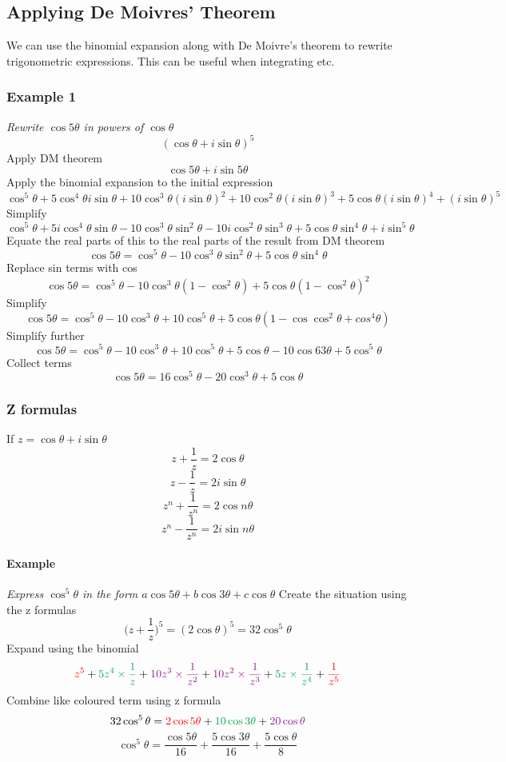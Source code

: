 \documentclass{article}[18pt]
\begin{document}
\subsection{Applying De Moivres' Theorem}
We can use the binomial expansion along with De Moivre's theorem to rewrite trigonometric expressions. This can be useful when integrating etc.
\subsubsection{Example 1}
\textit{Rewrite $\cos5\theta$ in powers of $\cos\theta$}
$$(\cos\theta+i\sin\theta)^5$$
Apply DM theorem
$$\cos5\theta+i\sin5\theta$$
Apply the binomial expansion to the initial expression
$$\cos^5\theta+5\cos^4\theta i\sin\theta+10\cos^3\theta(i\sin\theta)^2+10\cos^2\theta(i\sin\theta)^3+5\cos\theta(i\sin\theta)^4+(i\sin\theta)^5$$
Simplify
$$\cos^5\theta+5i\cos^4\theta\sin\theta-10\cos^3\theta\sin^2\theta-10i\cos^2\theta\sin^3\theta+5\cos\theta\sin^4\theta+i\sin^5\theta$$
Equate the real parts of this to the real parts of the result from DM theorem
$$\cos5\theta=\cos^5\theta-10\cos^3\theta\sin^2\theta+5\cos\theta\sin^4\theta$$
Replace sin terms with cos
$$\cos5\theta=\cos^5\theta-10\cos^3\theta(1-\cos^2\theta)+5\cos\theta(1-\cos^2\theta)^2$$
Simplify
$$\cos5\theta=\cos^5\theta-10\cos^3\theta+10\cos^5\theta+5\cos\theta(1-\cos\cos^2\theta+cos^4\theta)$$
Simplify further
$$\cos5\theta=\cos^5\theta-10\cos^3\theta+10\cos^5\theta+5\cos\theta-10\cos63\theta+5\cos^5\theta$$
Collect terms
$$\cos5\theta=16\cos^5\theta-20\cos^3\theta+5\cos\theta$$
\newpage
\subsubsection{Z formulas}
If $z=\cos\theta+i\sin\theta$
$$z+\frac{1}{z}=2\cos\theta$$
$$z-\frac{1}{z}=2i\sin\theta$$
$$z^n+\frac{1}{z^n}=2\cos n\theta$$
$$z^n-\frac{1}{z^n}=2i\sin n\theta$$
\paragraph{Example}
\textit{Express $\cos^5\theta$ in the form $a\cos5\theta+b\cos3\theta+c\cos\theta$}
Create the situation using the z formulas
$$\Bigg(z+\frac{1}{z}\Bigg)^5=(2\cos\theta)^5=32\cos^5\theta$$ 
Expand using the binomial
$$\textcolor{red}{z^5}+\textcolor{Green}{5z^4\times\frac{1}{z}}+\textcolor{Plum}{10z^3\times\frac{1}{z^2}}+\textcolor{Plum}{10z^2\times\frac{1}{z^3}}+\textcolor{Green}{5z\times\frac{1}{z^4}}+\textcolor{red}{\frac{1}{z^5}}$$
Combine like coloured term using z formula
$$32\cos^5\theta=\textcolor{red}{2\cos5\theta}+\textcolor{Green}{10\cos3\theta}+\textcolor{Plum}{20\cos\theta}$$
$$\cos^5\theta=\frac{\cos5\theta}{16}+\frac{5\cos3\theta}{16}+\frac{5\cos\theta}{8}$$
\end{document}

